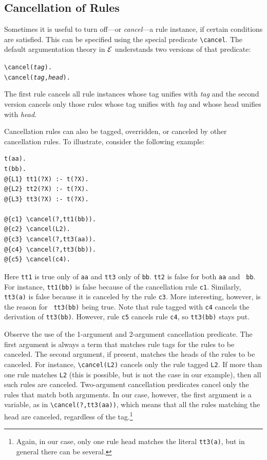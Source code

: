 \documentclass[11pt]{article}
\newcommand{\ERGO}{\mbox{\ensuremath{\cal{E}}\smaller{{\sc{RGO}}}}\xspace}
\newcommand{\FLSYSTEM}{\ERGO}
\newcommand{\bs}{\textbackslash}
\begin{document}
\subsection{Cancellation of Rules}\label{sec-cancel}

Sometimes it is useful to turn off---or \emph{cancel}---a rule instance, if
certain conditions are satisfied. This can be specified using the special
predicate {\tt \bs{}cancel}. The default argumentation theory in \FLSYSTEM  
understands two versions of that predicate:
\begin{alltt}
    \bs{}cancel(\textnormal{\textit{tag}}).
    \bs{}cancel(\textnormal{\textit{tag}},\textnormal{\textit{head}}).
\end{alltt}
The first rule cancels all rule instances whose tag unifies with
\emph{tag} and the second version cancels only those rules whose tag
unifies with \emph{tag} and whose head unifies with \emph{head}.   

Cancellation rules can also be tagged, overridden,
or canceled by other cancellation
rules. To illustrate,  consider the following example:
\begin{verbatim}
t(aa).
t(bb).
@{L1} tt1(?X) :- t(?X).
@{L2} tt2(?X) :- t(?X).
@{L3} tt3(?X) :- t(?X).

@{c1} \cancel(?,tt1(bb)).
@{c2} \cancel(L2).
@{c3} \cancel(?,tt3(aa)).
@{c4} \cancel(?,tt3(bb)).
@{c5} \cancel(c4).
\end{verbatim}
Here {\tt tt1} is true only of {\tt aa} and  
{\tt tt3} only of {\tt bb}. {\tt tt2} is false for both {\tt aa} and {\tt
  bb}. For instance, {\tt tt1(bb)} is false because of the cancellation
rule {\tt c1}. Similarly, {\tt tt3(a)} is false because it is canceled by
the rule {\tt c3}.   More interesting, however, is the reason for {\tt
  tt3(bb)} being true. Note that rule tagged with {\tt c4} cancels the
derivation of {\tt tt3(bb)}. However, rule {\tt c5} cancels rule {\tt c4},
so {\tt tt3(bb)} stays put.

Observe the use of the 1-argument and 2-argument cancellation predicate.
The first argument is always a term that matches rule tags for the rules
to be canceled. The second
argument, if present, matches the heads of the rules to be canceled. For
instance, {\tt \bs{}cancel(L2)} cancels only the rule tagged {\tt L2}. If more
than one rule matches {\tt L2} (this is possible, but is not the case in
our example), then all such rules are canceled. Two-argument cancellation
predicates cancel only the rules that match both arguments. In our case,
however, the first argument is a variable, as in {\tt \bs{}cancel(?,tt3(aa))},
which means that all the rules matching the head are canceled, regardless
of the tag.\footnote{
  Again, in our case, only one rule head matches the literal {\tt tt3(a)},
  but in general there can be several.
}
\end{document}
